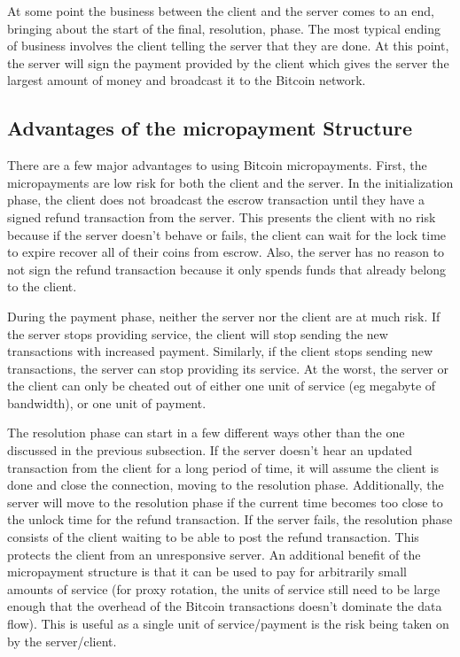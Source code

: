 At some point the business between the client and the server comes to an end, bringing about the start of the final, resolution, phase. The most typical ending of business involves the client telling the server that they are done. At this point, the server will sign the payment provided by the client which gives the server the largest amount of money and broadcast it to the Bitcoin network.

\subsection{Advantages of the micropayment Structure}

There are a few major advantages to using Bitcoin micropayments. First, the micropayments are low risk for both the client and the server. In the initialization phase, the client does not broadcast the escrow transaction until they have a signed refund transaction from the server. This presents the client with no risk because if the server doesn’t behave or fails, the client can wait for the lock time to expire recover all of their coins from escrow. Also, the server has no reason to not sign the refund transaction because it only spends funds that already belong to the client.

During the payment phase, neither the server nor the client are at much risk. If the server stops providing service, the client will stop sending the new transactions with increased payment. Similarly, if the client stops sending new transactions, the server can stop providing its service. At the worst, the server or the client can only be cheated out of either one unit of service (eg megabyte of bandwidth), or one unit of payment.

The resolution phase can start in a few different ways other than the one discussed in the previous subsection. If the server doesn't hear an updated transaction from the client for a long period of time, it will assume the client is done and close the connection, moving to the resolution phase. Additionally, the server will move to the resolution phase if the current time becomes too close to the unlock time for the refund transaction. If the server fails, the resolution phase consists of the client waiting to be able to post the refund transaction. This protects the client from an unresponsive server. An additional benefit of the micropayment structure is that it can be used to pay for arbitrarily small amounts of service (for proxy rotation, the units of service still need to be large enough that the overhead of the Bitcoin transactions doesn't dominate the data flow). This is useful as a single unit of service/payment is the risk being taken on by the server/client.

